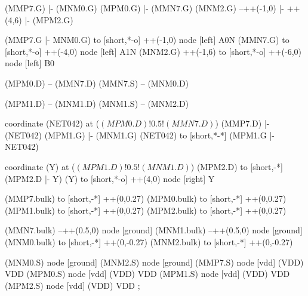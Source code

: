\begin{circuitikz}[american]
	(MMP7.G) |- (MNM0.G)
	(MPM0.G) |- (MMN7.G)
	(MNM2.G) --++(-1,0) |- ++(4,6) |- (MPM2.G) 
	
	(MMP7.G |- MNM0.G) to [short,*-o] ++(-1,0) node [left] {A0N} 
	(MMN7.G) to [short,*-o] ++(-4,0) node [left] {A1N}
	(MNM2.G) ++(-1,6) to [short,*-o] ++(-6,0) node [left] {B0}
	
	(MPM0.D) -- (MMN7.D)
	(MMN7.S) -- (MNM0.D)
	
	(MPM1.D) -- (MNM1.D)
	(MNM1.S) -- (MNM2.D)
	
	coordinate (NET042) at ($(MPM0.D)!0.5!(MMN7.D)$)
	(MMP7.D) |- (NET042) 
	(MPM1.G) |- (MNM1.G)
	(NET042) to [short,*-*] (MPM1.G |- NET042)
	
	coordinate (Y) at ($(MPM1.D)!0.5!(MNM1.D)$)
	(MPM2.D) to [short,-*] (MPM2.D |- Y)
	(Y) to [short,*-o] ++(4,0) node [right] {Y}
	
	(MMP7.bulk) to [short,-*] ++(0,0.27)
	(MPM0.bulk) to [short,-*] ++(0,0.27)
	(MPM1.bulk) to [short,-*] ++(0,0.27)
	(MPM2.bulk) to [short,-*] ++(0,0.27)
	
	(MMN7.bulk) --++(0.5,0) node [ground]{}
	(MNM1.bulk) --++(0.5,0) node [ground]{}
	(MNM0.bulk) to [short,-*] ++(0,-0.27)	
	(MNM2.bulk) to [short,-*] ++(0,-0.27)


	(MNM0.S) node [ground] {}
	(MNM2.S) node [ground] {}
	(MMP7.S) node [vdd] (VDD) {VDD}
	(MPM0.S) node [vdd] (VDD) {VDD}
	(MPM1.S) node [vdd] (VDD) {VDD}
	(MPM2.S) node [vdd] (VDD) {VDD}
;

\end{circuitikz}

